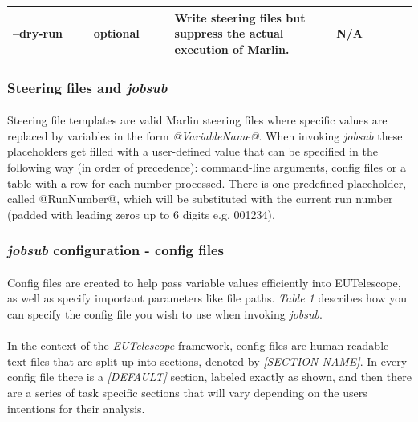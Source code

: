 \documentclass[11pt]{article}
\begin{document}
\begin{table}[!ht]
\begin{tabular}{|p{0.2\linewidth}|p{0.2\linewidth}|p{0.4\linewidth}|p{0.2\linewidth}|}
--dry-run                                & optional               & Write steering files but suppress the actual execution of Marlin.                                                                                                                                                                                          & N/A                            \\ \hline
\end{tabular}
\end{table}
\subsubsection{Steering files and \textit{jobsub}}
\paragraph{}
Steering file templates are valid Marlin steering files where specific values are replaced by variables in the form \textit{@VariableName@}. When invoking \textit{jobsub} these placeholders get filled with a user-defined value that can be specified in the following way (in order of precedence): command-line arguments, config files or a table with a row for each number processed. There is one predefined placeholder, called @RunNumber@, which will be substituted with the current run number (padded with leading zeros up to 6 digits e.g. 001234).
\subsubsection{\textit{jobsub} configuration - config files}
\paragraph{}
Config files are created to help pass variable values efficiently into EUTelescope, as well as specify important parameters like file paths. \textit{Table 1} describes how you can specify the config file you wish to use when invoking \textit{jobsub}.
\paragraph{}
In the context of the \textit{EUTelescope} framework, config files are human readable text files that are split up into sections, denoted by \textit{[SECTION NAME]}. In every config file there is a \textit{[DEFAULT]} section, labeled exactly as shown, and then there are a series of task specific sections that will vary depending on the users intentions for their analysis.
\end{document}
